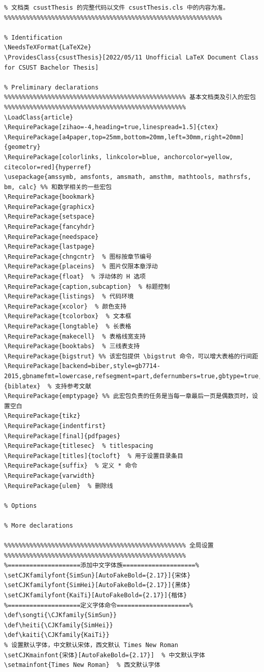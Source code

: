 \begin{lstlisting}[numbers=none,frame=none]
%%%%%%%%%%%%%%%%%%%%%%%%%%%%%%%%%%%%%%%%%%%%%%%%%%%%%%%%%%%%
% 文档类 csustThesis 的完整代码以文件 csustThesis.cls 中的内容为准。
%%%%%%%%%%%%%%%%%%%%%%%%%%%%%%%%%%%%%%%%%%%%%%%%%%%%%%%%%%%%

% Identification
\NeedsTeXFormat{LaTeX2e}
\ProvidesClass{csustThesis}[2022/05/11 Unofficial LaTeX Document Class for CSUST Bachelor Thesis]

% Preliminary declarations
%%%%%%%%%%%%%%%%%%%%%%%%%%%%%%%%%%%%%%%%%%%%%%%%%% 基本文档类及引入的宏包 %%%%%%%%%%%%%%%%%%%%%%%%%%%%%%%%%%%%%%%%%%%%%%%%%%
\LoadClass{article}
\RequirePackage[zihao=-4,heading=true,linespread=1.5]{ctex}
\RequirePackage[a4paper,top=25mm,bottom=20mm,left=30mm,right=20mm]{geometry}
\RequirePackage[colorlinks, linkcolor=blue, anchorcolor=yellow, citecolor=red]{hyperref}
\usepackage{amssymb, amsfonts, amsmath, amsthm, mathtools, mathrsfs, bm, calc} %% 和数学相关的一些宏包
\RequirePackage{bookmark}
\RequirePackage{graphicx}
\RequirePackage{setspace}
\RequirePackage{fancyhdr}
\RequirePackage{needspace}
\RequirePackage{lastpage}
\RequirePackage{chngcntr}  % 图标按章节编号
\RequirePackage{placeins}  % 图片仅限本章浮动
\RequirePackage{float}  % 浮动体的 H 选项
\RequirePackage{caption,subcaption}  % 标题控制
\RequirePackage{listings}  % 代码环境
\RequirePackage{xcolor}  % 颜色支持
\RequirePackage{tcolorbox}  % 文本框
\RequirePackage{longtable}  % 长表格
\RequirePackage{makecell}  % 表格线宽支持
\RequirePackage{booktabs}  % 三线表支持
\RequirePackage{bigstrut} %% 该宏包提供 \bigstrut 命令，可以增大表格的行间距
\RequirePackage[backend=biber,style=gb7714-2015,gbnamefmt=lowercase,refsegment=part,defernumbers=true,gbtype=true,]{biblatex}  % 支持参考文献
\RequirePackage{emptypage} %% 此宏包负责的任务是当每一章最后一页是偶数页时，设置空白
\RequirePackage{tikz}
\RequirePackage{indentfirst}
\RequirePackage[final]{pdfpages}
\RequirePackage{titlesec}  % titlespacing
\RequirePackage[titles]{tocloft}  % 用于设置目录条目
\RequirePackage{suffix}  % 定义 * 命令
\RequirePackage{varwidth}  
\RequirePackage{ulem}  % 删除线  

% Options

% More declarations

%%%%%%%%%%%%%%%%%%%%%%%%%%%%%%%%%%%%%%%%%%%%%%%%%% 全局设置 %%%%%%%%%%%%%%%%%%%%%%%%%%%%%%%%%%%%%%%%%%%%%%%%%%
%====================添加中文字体族====================%
\setCJKfamilyfont{SimSun}[AutoFakeBold={2.17}]{宋体}
\setCJKfamilyfont{SimHei}[AutoFakeBold={2.17}]{黑体}
\setCJKfamilyfont{KaiTi}[AutoFakeBold={2.17}]{楷体}
%====================定义字体命令====================%
\def\songti{\CJKfamily{SimSun}}
\def\heiti{\CJKfamily{SimHei}}
\def\kaiti{\CJKfamily{KaiTi}}
% 设置默认字体，中文默认宋体，西文默认 Times New Roman
\setCJKmainfont{宋体}[AutoFakeBold={2.17}]  % 中文默认字体
\setmainfont{Times New Roman}  % 西文默认字体


\end{lstlisting}

